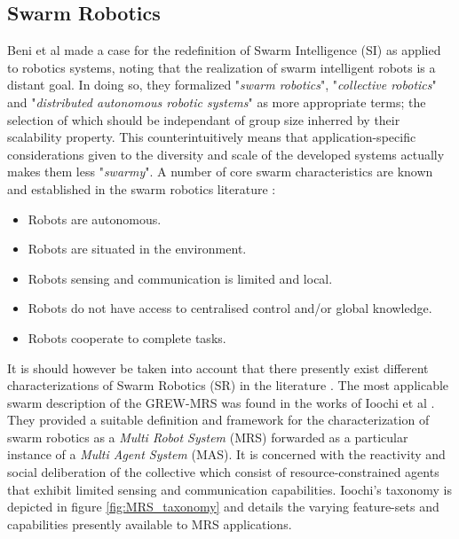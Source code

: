 \documentclass{report}
\begin{document}
\subsection{Swarm Robotics}
Beni et al \cite{Beni2005a} made a case for the redefinition of Swarm Intelligence (SI) as applied to robotics systems, noting that the realization of swarm intelligent robots is a distant goal. In doing so, they formalized "\textit{swarm robotics}", "\textit{collective robotics}" and "\textit{distributed autonomous robotic systems}" as more appropriate terms; the selection of which should be independant of group size inherred by their scalability property. This counterintuitively means that application-specific considerations given to the diversity and scale of the developed systems actually makes them less "\textit{swarmy}".
\newpage
A number of core swarm characteristics are known and established in the swarm robotics literature \cite{Brambilla2013a}:
\begin{itemize}
	\item Robots are autonomous.
	\item Robots are situated in the environment.
	\item Robots sensing and communication is limited and local.
	\item Robots do not have access to centralised control and/or global knowledge.
	\item Robots cooperate to complete tasks.
\end{itemize}

It is should however be taken into account that there presently exist different characterizations of Swarm Robotics (SR) in the literature \cite{Sahin2005} \cite{Beni2005a} \cite{Dorigo2013} \cite{DorigoSahin2004}. The most applicable swarm description of the GREW-MRS was found in the works of Ioochi et al \cite{Iocchi2001}. They provided a suitable definition and framework for the characterization of swarm robotics as a \textit{Multi Robot System} (MRS) forwarded as a particular instance of a \textit{Multi Agent System} (MAS). It is concerned with the reactivity and social deliberation of the collective which consist of resource-constrained agents that exhibit limited sensing and communication capabilities. Ioochi's taxonomy is depicted in figure \ref{fig:MRS_taxonomy} and details the varying feature-sets and capabilities presently available to MRS applications.
\end{document}
